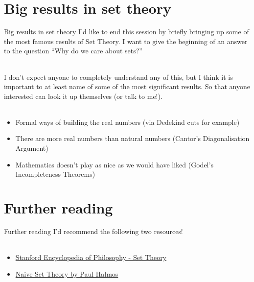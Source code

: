 \documentclass{beamer}
\begin{document}
\section{Big results in set theory}

\begin{frame}{Big results in set theory}
    I'd like to end this session by briefly bringing up some of the most famous results of Set Theory.
    I want to give the beginning of an answer to the question ``Why do we care about sets?'' \\~\

    I don't expect anyone to completely understand any of this,
    but I think it is important to at least name of some of the most significant results.
    So that anyone interested can look it up themselves (or talk to me!). \\~\
    \begin{itemize}
        \item Formal ways of building the real numbers (via Dedekind cuts for example)
        \item There are more real numbers than natural numbers (Cantor's Diagonalisation Argument)
        \item Mathematics doesn't play as nice as we would have liked (Godel's Incompleteness Theorems)
    \end{itemize}
\end{frame}

\section{Further reading}

\begin{frame}{Further reading}
    I'd recommend the following two resources! \\~\
    \begin{itemize}
        \item \href{https://plato.stanford.edu/entries/set-theory/}{Stanford Encyclopedia of Philosophy - Set Theory}
        \item \href{https://en.wikipedia.org/wiki/Naive_Set_Theory_(book)}{Naive Set Theory by Paul Halmos}
    \end{itemize}
\end{frame}
\end{document}
